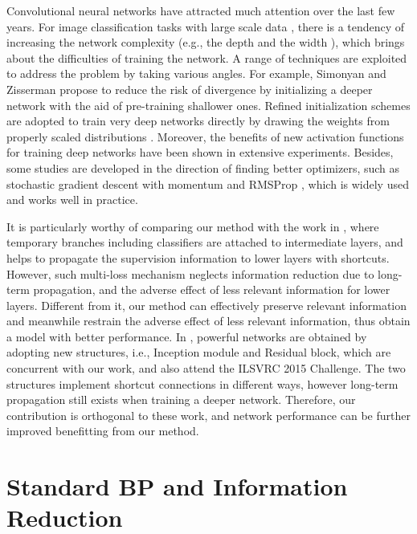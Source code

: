 \documentclass[runningheads]{llncs}
\begin{document}
Convolutional neural networks have attracted much attention over the last few years.
For image classification tasks with large scale data \cite{zhou_nips2014,xiao_ijcv2014,russakovsky_ijcv2015}, there is a tendency of increasing the network complexity (e.g., the depth \cite{simonyan_iclr2015} and the width \cite{zeiler_eccv2014}), which brings about the difficulties of training the network. A range of techniques are exploited to address the problem by taking various angles. For example, Simonyan and Zisserman \cite{simonyan_iclr2015} propose to reduce the risk of divergence by initializing a deeper network with the aid of pre-training shallower ones. Refined initialization schemes are adopted to train very deep networks directly by drawing the weights from properly scaled distributions \cite{glorot_icais2010,he_iccv2015}. Moreover, the benefits of new activation functions \cite{nair_icml2010,he_iccv2015,goodfellow_2013} for training deep networks have been shown in extensive experiments. Besides, some studies are developed in the direction of finding better optimizers, such as stochastic gradient descent with momentum \cite{sutskever_icml2013} and RMSProp \cite{tieleman_2012}, which is widely used and works well in practice.

It is particularly worthy of comparing our method with the work in \cite{lee_2015,szegedy_cvpr2015}, where temporary branches including classifiers are attached to intermediate layers, and helps to propagate the supervision information to lower layers with shortcuts. However, such multi-loss mechanism neglects information reduction due to long-term propagation, and the adverse effect of less relevant information for lower layers. Different from it, our method can effectively preserve relevant information and meanwhile restrain the adverse effect of less relevant information, thus obtain a model with better performance. In \cite{szegedy_2015,he_cvpr2016}, powerful networks are obtained by adopting new structures, i.e., Inception module and Residual block, which are concurrent with our work, and also attend the ILSVRC 2015 Challenge. The two structures implement shortcut connections in different ways, however long-term propagation still exists when training a deeper network. Therefore, our contribution is orthogonal to these work, and network performance can be further improved benefitting from our method.

\section{Standard BP and Information Reduction}
\end{document}
